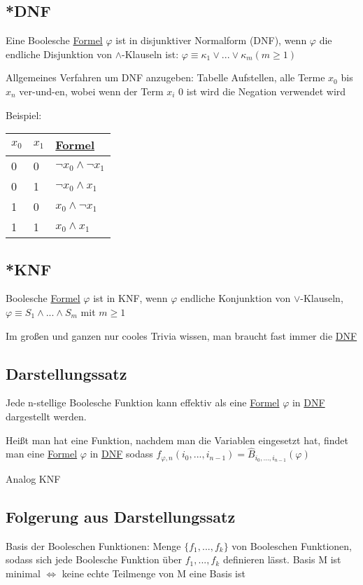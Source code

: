 \documentclass[12pt,a4paper]{article} %
\begin{document}
	\subsection{*DNF}
	\label{DNF}
	Eine Boolesche \hyperref[Formel]{Formel} $\varphi$ ist in disjunktiver Normalform (DNF), wenn
	$\varphi$ die endliche Disjunktion von $\land$-Klauseln ist: $\varphi \equiv \kappa_1 \lor ... \lor \kappa_m (m \ge 1)$
	
	Allgemeines Verfahren um DNF anzugeben: Tabelle Aufstellen, alle Terme $x_0$ bis $x_n$ ver-und-en, wobei wenn der Term $x_i$ 0 ist wird die Negation verwendet wird
	
	Beispiel:
	
	\begin{tabular}{l | l | l}
		$x_0$ & $x_1$ & \hyperref[Formel]{Formel} \\ \hline
		0 & 0 & $\neg x_0 \land \neg x_1$ \\
		0 & 1 & $\neg x_0 \land x_1$ \\
		1 & 0 & $x_0 \land \neg x_1$ \\
		1 & 1 & $x_0 \land x_1$ \\
	\end{tabular}
	
	\subsection{*KNF}
	Boolesche \hyperref[Formel]{Formel} $\varphi$ ist in KNF, wenn $\varphi$ endliche Konjunktion von $\lor$-Klauseln, $\varphi \equiv S_1 \land ... \land S_m$ mit $m \ge 1$
	
	Im großen und ganzen nur cooles Trivia wissen, man braucht fast immer die \hyperref[DNF]{DNF}
	
	\subsection{Darstellungssatz}
	Jede n-stellige Boolesche Funktion kann effektiv als eine \hyperref[Formel]{Formel} $\varphi$ in \hyperref[DNF]{DNF} dargestellt werden. 
	
	Heißt man hat eine Funktion, nachdem man die Variablen eingesetzt hat, findet man eine \hyperref[Formel]{Formel} $\varphi$ in \hyperref[DNF]{DNF} sodass $f_{\varphi, n}(i_0, ..., i_{n-1}) = \widehat{B}_{i_0, ..., i_{n - 1}}(\varphi)$
	
	Analog KNF

	\subsection{Folgerung aus Darstellungssatz}
	Basis der Booleschen Funktionen: \newline
	Menge $\{f_1, ..., f_k\}$ von Booleschen Funktionen, sodass sich jede Boolesche Funktion über $
	f_1, ..., f_k$ definieren lässt. \newline
	Basis M ist minimal $\Leftrightarrow$ keine echte Teilmenge von M eine Basis ist
	
\end{document}
